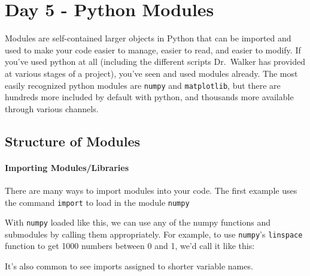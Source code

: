 \chapter{Day 5 - Python Modules}
Modules are self-contained larger objects in Python that can be imported
and used to make your code easier to manage, easier to read, and easier
to modify. If you've used python at all (including the different scripts
Dr.~Walker has provided at various stages of a project), you've seen and
used modules already. The most easily recognized python modules are
\texttt{numpy} and \texttt{matplotlib}, but there are hundreds more
included by default with python, and thousands more available through
various channels.
\section{Structure of Modules}

\hypertarget{importing-moduleslibraries}{%
\subsubsection{Importing
Modules/Libraries}\label{importing-moduleslibraries}}

There are many ways to import modules into your code. The first example
uses the command \texttt{import} to load in the module \texttt{numpy}

\begin{Shaded}
\begin{Highlighting}[]
\end{Highlighting}
\end{Shaded}

With \texttt{numpy} loaded like this, we can use any of the numpy
functions and submodules by calling them appropriately. For example, to
use \texttt{numpy}'s \texttt{linspace} function to get 1000 numbers
between 0 and 1, we'd call it like this:

\begin{Shaded}
\begin{Highlighting}[]
\OperatorTok{=}\NormalTok{,}\NormalTok{,}\NormalTok{)}
\end{Highlighting}
\end{Shaded}

It's also common to see imports assigned to shorter variable names.

\begin{Shaded}
\begin{Highlighting}[]
\end{Highlighting}
\end{Shaded}

